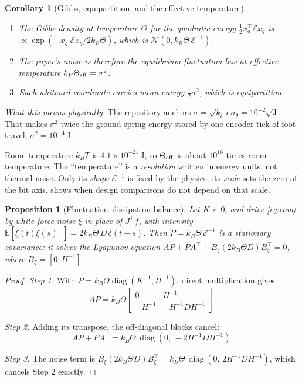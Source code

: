 \documentclass[11pt]{article}
\newtheorem{proposition}[theorem]{Proposition}
\newtheorem{corollary}[theorem]{Corollary}
\theoremstyle{definition}
\theoremstyle{remark}
\newcommand{\E}{\mathbb{E}}
\newcommand{\diag}{\operatorname{diag}}
\newcommand{\Em}{\mathcal{E}}         %
\newcommand{\phys}[1]{\par\smallskip\noindent\textit{What this means physically.} #1\par}
\begin{document}
\begin{corollary}[Gibbs, equipartition, and the effective temperature]\label{cor:gibbs}
\begin{enumerate}[nosep]
  \item The Gibbs density at temperature $\Theta$ for the quadratic energy
        $\frac12x_q^\top\Em x_q$ is $\propto\exp(-x_q^\top\Em x_q/2k_B\Theta)$, which is
        $\mathcal N(0,k_B\Theta\,\Em^{-1})$.
  \item The paper's noise is therefore the equilibrium fluctuation law at effective
        temperature $k_B\Theta_{\rm eff}=\sigma^2$.
  \item Each whitened coordinate carries mean energy $\frac12\sigma^2$, which is
        equipartition.
\end{enumerate}
\end{corollary}

\phys{The repository anchors $\sigma=\sqrt{k_i}\,r\,\sigma_\theta=10^{-2}\sqrt{\mathrm J}$.
That makes $\sigma^2$ twice the ground-spring energy stored by one encoder tick of foot
travel, $\sigma^2=10^{-4}$\,J.

Room-temperature $k_BT$ is $4.1\times10^{-21}$\,J, so $\Theta_{\rm eff}$ is about
$10^{16}$ times room temperature. The ``temperature'' is a \emph{resolution} written in
energy units, not thermal noise. Only its \emph{shape} $\Em^{-1}$ is fixed by the physics;
its \emph{scale} sets the zero of the bit axis. \Cref{prop:snr} shows when design
comparisons do not depend on that scale.}

\begin{proposition}[Fluctuation--dissipation balance]\label{prop:fdt}
Let $K\succ0$, and drive \eqref{eq:eom} by white force noise $\xi$ in place of
$J^\top f$, with intensity $\E[\xi(t)\xi(s)^\top]=2k_B\Theta\,D\,\delta(t-s)$. Then
$P=k_B\Theta\,\Em^{-1}$ is a stationary covariance: it solves the Lyapunov equation
$AP+PA^\top+B_\xi(2k_B\Theta D)B_\xi^\top=0$, where $B_\xi=[0;H^{-1}]$.
\end{proposition}
\begin{proof}
\emph{Step 1.} With $P=k_B\Theta\diag(K^{-1},H^{-1})$, direct multiplication gives
\[
  AP=k_B\Theta\begin{bmatrix}0&H^{-1}\\-H^{-1}&-H^{-1}DH^{-1}\end{bmatrix}.
\]

\emph{Step 2.} Adding its transpose, the off-diagonal blocks cancel:
\[
  AP+PA^\top=k_B\Theta\,\diag(0,\,-2H^{-1}DH^{-1}).
\]

\emph{Step 3.} The noise term is
$B_\xi(2k_B\Theta D)B_\xi^\top=k_B\Theta\,\diag(0,\,2H^{-1}DH^{-1})$, which cancels
Step 2 exactly.
\end{proof}
\end{document}
